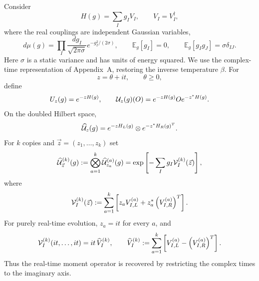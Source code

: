 \documentclass{article}
\theoremstyle{definition}
\begin{document}
Consider
\begin{equation}
    H(g)=\sum_I g_I V_I,
    \qquad V_I=V_I^\dagger,
\end{equation}
where the real couplings are independent Gaussian variables,
\begin{equation}
    d\mu(g)=\prod_I\frac{dg_I}{\sqrt{2\pi\sigma}}
    e^{-g_I^2/(2\sigma)},
    \qquad
    \mathbb E_g[g_I]=0,
    \qquad
    \mathbb E_g[g_Ig_J]=\sigma\delta_{IJ}.
\end{equation}
Here $\sigma$ is a static variance and has units of energy squared. We use the complex-time representation of Appendix~A, restoring the inverse temperature $\beta$. For
\begin{equation}
    z=\theta+it,
    \qquad \theta\geq0,
\end{equation}
define
\begin{equation}
    U_z(g)=e^{-zH(g)},
    \qquad
    {\cal U}_z(g)(O)=e^{-zH(g)}Oe^{-z^*H(g)}.
\end{equation}
On the doubled Hilbert space,
\begin{equation}
    \widehat{\cal U}_z(g)
    =e^{-zH_L(g)}\otimes e^{-z^*H_R(g)^T}.
\end{equation}
For $k$ copies and $\vec z=(z_1,\ldots,z_k)$ set
\begin{equation}
    \widehat{\cal U}_{\vec z}^{(k)}(g)
    :=\bigotimes_{a=1}^k\widehat{\cal U}_{z_a}^{(a)}(g)
    =\exp\left[-\sum_I g_I{\cal V}_I^{(k)}(\vec z)\right],
    \label{eq:quenched_complex_evolution}
\end{equation}
where
\begin{equation}
    {\cal V}_I^{(k)}(\vec z)
    :=\sum_{a=1}^k\left[
        z_a V_{I,L}^{(a)}
        +z_a^*\left(V_{I,R}^{(a)}\right)^T
    \right].
    \label{eq:quenched_complex_interaction}
\end{equation}
For purely real-time evolution, $z_a=it$ for every $a$, and
\begin{equation}
    {\cal V}_I^{(k)}(it,\ldots,it)
    =it\,\widehat V_I^{(k)},
    \qquad
    \widehat V_I^{(k)}
    :=\sum_{a=1}^k\left[
        V_{I,L}^{(a)}-\left(V_{I,R}^{(a)}\right)^T
    \right].
    \label{eq:quenched_realtime_reduction}
\end{equation}
Thus the real-time moment operator is recovered by restricting the complex times to the imaginary axis.
\end{document}
